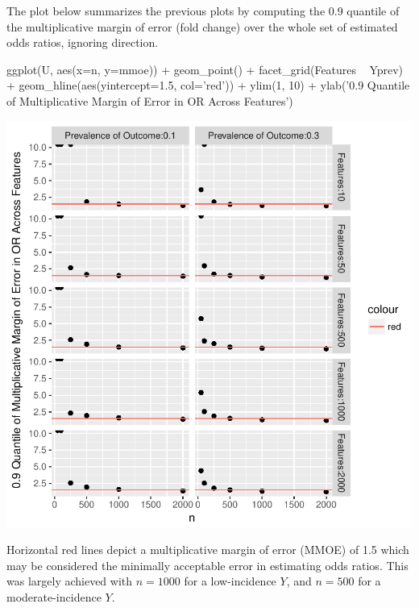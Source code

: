 The plot below summarizes the previous plots by computing the 0.9 quantile of
the multiplicative margin of error (fold change) over the whole set of estimated
odds ratios, ignoring direction. 
\begin{Schunk}
\begin{Sinput}
ggplot(U, aes(x=n, y=mmoe)) + geom_point() + facet_grid(Features ~ Yprev) +
  geom_hline(aes(yintercept=1.5, col='red')) +
  ylim(1, 10) +
  ylab('0.9 Quantile of Multiplicative Margin of Error in OR Across Features')
\end{Sinput}


\centerline{\includegraphics[width=\maxwidth]{hdata-simor-mmoe-1} }

\end{Schunk}
Horizontal red lines depict a multiplicative margin of error (MMOE) of
1.5 which may be considered the minimally acceptable error in
estimating odds ratios.  This was largely achieved with $n=1000$ for a
low-incidence $Y$, and $n=500$ for a moderate-incidence $Y$.

